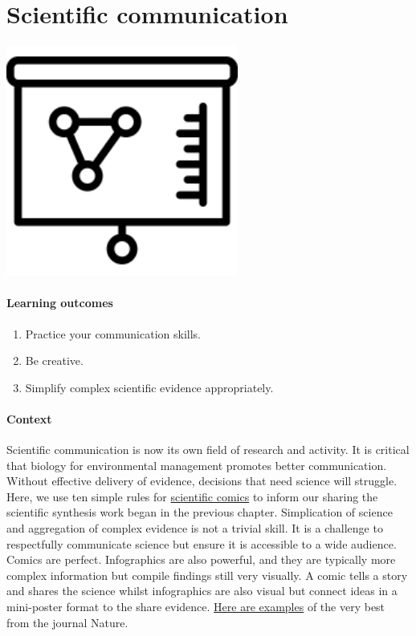 \documentclass[
]{book}
\providecommand{\tightlist}{%
  \setlength{\itemsep}{0pt}\setlength{\parskip}{0pt}}
\begin{document}
\hypertarget{scicomm}{%
\chapter{Scientific communication}\label{scicomm}}

\includegraphics[width=3in,height=\textheight]{./scicomm.png}

\hypertarget{learning-outcomes-7}{%
\subsubsection*{Learning outcomes}\label{learning-outcomes-7}}

\begin{enumerate}
\def\labelenumi{\arabic{enumi}.}
\tightlist
\item
  Practice your communication skills.
\item
  Be creative.\\
\item
  Simplify complex scientific evidence appropriately.
\end{enumerate}

\hypertarget{context-6}{%
\subsubsection*{Context}\label{context-6}}

Scientific communication is now its own field of research and activity. It is critical that biology for environmental management promotes better communication. Without effective delivery of evidence, decisions that need science will struggle. Here, we use ten simple rules for \href{https://journals.plos.org/ploscompbiol/article?id=10.1371/journal.pcbi.1005845}{scientific comics} \citep{RN7247} to inform our sharing the scientific synthesis work began in the previous chapter. Simplication of science and aggregation of complex evidence is not a trivial skill. It is a challenge to respectfully communicate science but ensure it is accessible to a wide audience. Comics are perfect. Infographics are also powerful, and they are typically more complex information but compile findings still very visually. A comic tells a story and shares the science whilst infographics are also visual but connect ideas in a mini-poster format to the share evidence. \href{https://www.nature.com/articles/d41586-017-08542-5}{Here are examples} of the very best from the journal Nature.
\end{document}

